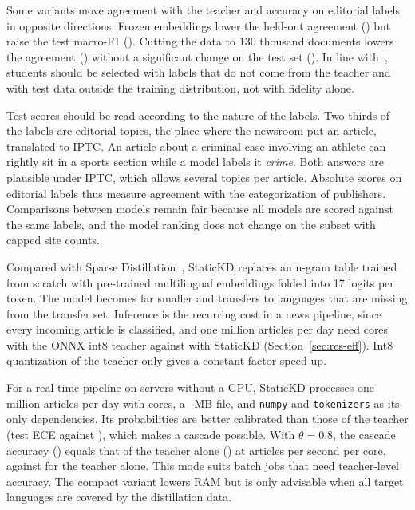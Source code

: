 Some variants move agreement with the teacher and accuracy on editorial labels in opposite directions. Frozen embeddings lower the held-out agreement () but raise the test macro-F1 (). Cutting the data to 130 thousand documents lowers the agreement () without a significant change on the test set (). In line with~\cite{stanton2021kd}, students should be selected with labels that do not come from the teacher and with test data outside the training distribution, not with fidelity alone.

Test scores should be read according to the nature of the labels. Two thirds of the labels are editorial topics, the place where the newsroom put an article, translated to IPTC. An article about a criminal case involving an athlete can rightly sit in a sports section while a model labels it \emph{crime}. Both answers are plausible under IPTC, which allows several topics per article. Absolute scores on editorial labels thus measure agreement with the categorization of publishers. Comparisons between models remain fair because all models are scored against the same labels, and the model ranking does not change on the subset with capped site counts.

Compared with Sparse Distillation~\cite{ye2022sparse}, StaticKD replaces an n-gram table trained from scratch with pre-trained multilingual embeddings folded into 17 logits per token. The model becomes far smaller and transfers to languages that are missing from the transfer set. Inference is the recurring cost in a news pipeline, since every incoming article is classified, and one million articles per day need  cores with the ONNX int8 teacher against  with StaticKD (Section~\ref{sec:res-eff}). Int8 quantization of the teacher only gives a constant-factor speed-up.

For a real-time pipeline on servers without a GPU, StaticKD processes one million articles per day with  cores, a ~MB file, and \texttt{numpy} and \texttt{tokenizers} as its only dependencies. Its probabilities are better calibrated than those of the teacher (test ECE  against ), which makes a cascade possible. With $\theta=0.8$, the cascade accuracy () equals that of the teacher alone () at  articles per second per core, against  for the teacher alone. This mode suits batch jobs that need teacher-level accuracy. The compact variant lowers RAM but is only advisable when all target languages are covered by the distillation data.
